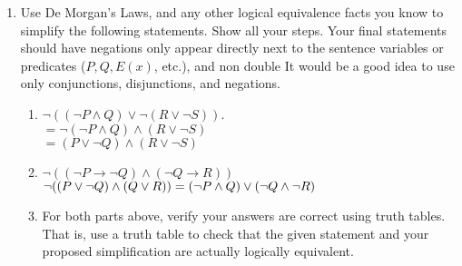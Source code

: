\documentclass[11pt,a4paper]{article}
\newcommand\setItemNumber[1]{\setcounter{enumi}{\numexpr#1-1\relax}}
\begin{document}
\begin{enumerate}
        \setItemNumber{9}
        \item Use De Morgan’s Laws, and any other logical equivalence facts you know to simplify the following statements. Show all your steps. Your final statements should have negations only appear directly next to the sentence variables or predicates ($P, Q, E(x)$, etc.), and non double It would be a good idea to use only conjunctions, disjunctions, and negations.
            \begin{enumerate}
                \item $\neg((\neg P\land Q)\lor \neg(R\lor\neg S))$.\\
                    $ = \neg(\neg P\land Q) \land (R\lor\neg S)$\\
                    $ = (P\lor\neg Q)\land(R\lor \neg S)$
                \item $\neg((\neg P\rightarrow\neg Q) \land(\neg Q\rightarrow R))$\\
                    $\neg((P\lor\neg Q)\land(Q\lor R))\\ = (\neg P\land Q)\lor(\neg Q\land\neg R)$

                \item For both parts above, verify your answers are correct using truth tables. That is, use a truth table to check that the given statement and your proposed simplification are actually logically equivalent.\\

                \begin{enumerate}
                    

\end{enumerate}
\end{enumerate}
\end{enumerate}
\end{document}
